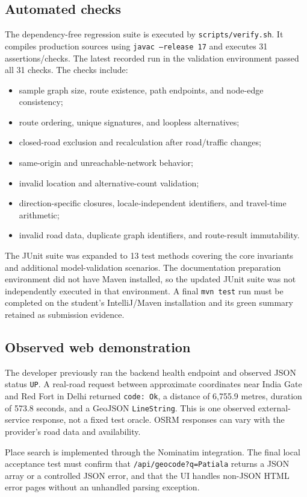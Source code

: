 \documentclass[11pt,a4paper]{article}
\begin{document}
\subsection{Automated checks}
The dependency-free regression suite is executed by \texttt{scripts/verify.sh}. It compiles production sources using \texttt{javac --release 17} and executes 31 assertions/checks. The latest recorded run in the validation environment passed all 31 checks. The checks include:
\begin{itemize}
  \item sample graph size, route existence, path endpoints, and node-edge consistency;
  \item route ordering, unique signatures, and loopless alternatives;
  \item closed-road exclusion and recalculation after road/traffic changes;
  \item same-origin and unreachable-network behavior;
  \item invalid location and alternative-count validation;
  \item direction-specific closures, locale-independent identifiers, and travel-time arithmetic;
  \item invalid road data, duplicate graph identifiers, and route-result immutability.
\end{itemize}

The JUnit suite was expanded to 13 test methods covering the core invariants and additional model-validation scenarios. The documentation preparation environment did not have Maven installed, so the updated JUnit suite was not independently executed in that environment. A final \texttt{mvn test} run must be completed on the student's IntelliJ/Maven installation and its green summary retained as submission evidence.

\subsection{Observed web demonstration}
The developer previously ran the backend health endpoint and observed JSON status \texttt{UP}. A real-road request between approximate coordinates near India Gate and Red Fort in Delhi returned \texttt{code: Ok}, a distance of 6,755.9 metres, duration of 573.8 seconds, and a GeoJSON \texttt{LineString}. This is one observed external-service response, not a fixed test oracle. OSRM responses can vary with the provider's road data and availability.

Place search is implemented through the Nominatim integration. The final local acceptance test must confirm that \texttt{/api/geocode?q=Patiala} returns a JSON array or a controlled JSON error, and that the UI handles non-JSON HTML error pages without an unhandled parsing exception.
\end{document}
